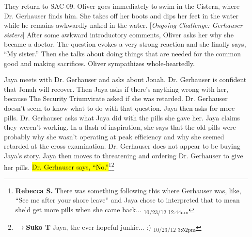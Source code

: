 


They return to SAC-09.  Oliver goes immediately to swim in the Cistern, where Dr. Gerhauser finds him.  She takes off her boots and dips her feet in the water while he remains awkwardly naked in the water.  {[}\textit{Ongoing Challenge: Gerhauser sisters}{]}  After some awkward introductory comments, Oliver asks her why she became a doctor.  The question evokes a very strong reaction and she finally says, ``My sister.''  Then she talks about doing things that are needed for the common good and making sacrifices.  Oliver sympathizes whole-heartedly.



Jaya meets with Dr. Gerhauser and asks about Jonah.  Dr. Gerhauser is confident that Jonah will recover.  Then Jaya asks if there's anything wrong with her, because The Security Triumvirate asked if she was retarded.  Dr. Gerhauser doesn't seem to know what to do with that question.  Jaya then asks for more pills.  Dr. Gerhauser asks what Jaya did with the pills she gave her.  Jaya claims they weren't working.  In a flash of inspiration, she says that the old pills were probably why she wasn't operating at peak efficiency and why she seemed retarded at the cross examination.  Dr. Gerhauser does not appear to be buying Jaya's story.  Jaya then moves to threatening and ordering Dr. Gerhauser to give her pills.  \hl{Dr. Gerhauser says, ``No.''}\footnote{\textbf{Rebecca S. }There was something following this where Gerhauser was, like, ``See me after your shore leave'' and Jaya chose to interpreted that to mean she'd get more pills when she came back... \textsubscript{10/23/12 12:44am}}\footnote{$\rightarrow$\textbf{Suko T }Jaya, the ever hopeful junkie... :) \textsubscript{10/23/12 3:52pm}}



